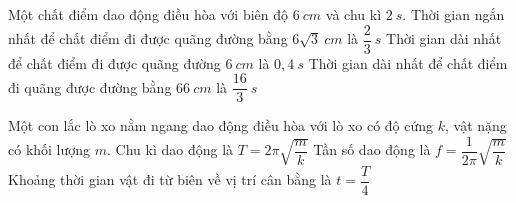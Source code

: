 \begin{ex}
	Một chất điểm dao động điều hòa với biên độ $6 \ cm$ và chu kì $2 \ s$.
	{\True Thời gian ngắn nhất để chất điểm đi được quãng đường bằng $6 \sqrt{3} \ cm$ là $\dfrac{2}{3} \ s$}
	{Thời gian dài nhất để chất điểm đi được quãng đường $6 \ cm$ là $0,4 \ s$}
	{Thời gian dài nhất để chất điểm đi quãng được đường bằng $66 \ cm$ là $\dfrac{16}{3} \ s$}
	
\end{ex}
\begin{ex}
	Một con lắc lò xo nằm ngang dao động điều hòa  với lò xo có độ cứng $k$, vật nặng có khối lượng $m$.
	{\True Chu kì dao động là $T=2 \pi \sqrt{\dfrac{m}{k}}$}
	{Tần số dao động là $f=\dfrac{1}{2 \pi} \sqrt{\dfrac{m}{k}}$}
	{\True Khoảng thời gian vật đi từ biên về vị trí cân bằng là $t=\dfrac{T}{4}$}
	
\end{ex}
